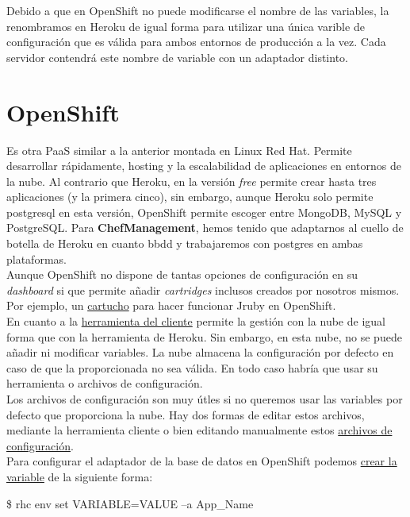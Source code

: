 Debido a que en OpenShift no puede modificarse el nombre de las variables, la renombramos en Heroku de igual forma para utilizar una única varible de configuración que es válida para ambos entornos de producción a la vez. Cada servidor contendrá este nombre de variable con un adaptador distinto.


\vspace*{0.2in}
\section{OpenShift}\label{cap.3.3}
Es otra PaaS similar a la anterior montada en Linux Red Hat. Permite desarrollar rápidamente, hosting y la escalabilidad de aplicaciones en entornos de la nube. Al contrario que Heroku, en la versión \emph{free} permite crear hasta tres aplicaciones (y la primera cinco), sin embargo, aunque Heroku solo permite postgresql en esta versión, OpenShift permite escoger entre MongoDB, MySQL y PostgreSQL. Para \textbf{ChefManagement}, hemos tenido que adaptarnos al cuello de botella de Heroku en cuanto bbdd y trabajaremos con postgres en ambas plataformas. \\

Aunque OpenShift no dispone de tantas opciones de configuración en su \emph{dashboard} si que permite añadir \emph{cartridges} inclusos creados por nosotros mismos. Por ejemplo, un \href{https://github.com/openshift-cartridges/jruby-cartridge}{cartucho} para hacer funcionar Jruby en OpenShift. \\

En cuanto a la \href{https://developers.openshift.com/en/managing-client-tools.html}{herramienta del cliente} permite la gestión con la nube de igual forma que con la herramienta de Heroku. Sin embargo, en esta nube, no se puede añadir ni modificar variables. La nube almacena la configuración por defecto en caso de que la proporcionada no sea válida. En todo caso habría que usar su herramienta o archivos de configuración. \\

Los archivos de configuración son muy útles si no queremos usar las variables por defecto que proporciona la nube. Hay dos formas de editar estos archivos, mediante la herramienta cliente o bien editando manualmente estos \href{https://blog.openshift.com/netsource-partners-shows-the-benefits-of-custom-environment-variables-on-openshift/}{archivos de configuración}. \\

Para configurar el adaptador de la base de datos en OpenShift podemos \href{https://developers.openshift.com/en/managing-environment-variables.html}{crear la variable} de la siguiente forma:
\begin{center}
	\$ rhc env set VARIABLE=VALUE --a App\_Name
\end{center}

